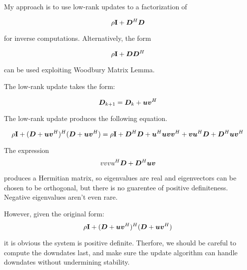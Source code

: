 \documentclass{article}
\begin{document}
My approach is to use low-rank updates to a factorization of

\begin{equation}
\rho{\bf I} + \bm{D}^H\bm{D}
\end{equation}

for inverse computations. Alternatively, the form

\begin{equation}
\rho{\bf I} + \bm{D}\bm{D}^H
\end{equation}

can be used exploiting Woodbury Matrix Lemma.

The low-rank update takes the form:

\begin{equation}
\bm{D}_{k+1} = \bm{D}_k + \bm{u}\bm{v}^H
\end{equation}

The low-rank update produces the following equation.

\begin{equation}
\rho{\bf I} + (\bm{D} + \bm{u}\bm{v}^H)^H(\bm{D} + \bm{u}\bm{v}^H) = \rho{\bf I} + \bm{D}^H\bm{D} + \bm{u}^H\bm{u} \bm{v}\bm{v}^H + \bm{v}\bm{u}^H\bm{D} + \bm{D}^H\bm{u}\bm{v}^H
\end{equation}

The expression
\begin{equation}
vvvu^H\bm{D} + \bm{D}^H\bm{u}\bm{v}
\end{equation}

produces a Hermitian matrix, so eigenvalues are real and eigenvectors can be chosen to be orthogonal, but there is no guarentee of positive definiteness. Negative eigenvalues aren't even rare.

However, given the original form:
\begin{equation}
\rho{\bf I} + (\bm{D} + \bm{u}\bm{v}^H)^H(\bm{D} + \bm{u}\bm{v}^H) 
\end{equation}

it is obvious the system is positive definite. Therfore, we should be careful to compute the downdates last, and make sure the update algorithm can handle downdates without undermining stability.
\end{document}
